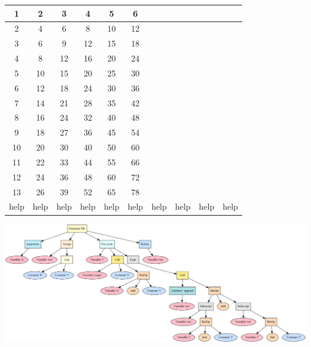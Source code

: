 \documentclass[12pt]{article}
\begin{document}
\begin{tabular}{ |c|c|c|c|c|c|c|c|c|c|}
\hline
1 & 2 & 3 & 4 & 5 & 6 &  &  &  &   \\
\hline
2 & 4 & 6 & 8 & 10 & 12 &  &  &  &   \\
\hline
3 & 6 & 9 & 12 & 15 & 18 &  &  &  &   \\
\hline
4 & 8 & 12 & 16 & 20 & 24 &  &  &  &   \\
\hline
5 & 10 & 15 & 20 & 25 & 30 &  &  &  &   \\
\hline
6 & 12 & 18 & 24 & 30 & 36 &  &  &  &   \\
\hline
7 & 14 & 21 & 28 & 35 & 42 &  &  &  &   \\
\hline
8 & 16 & 24 & 32 & 40 & 48 &  &  &  &   \\
\hline
9 & 18 & 27 & 36 & 45 & 54 &  &  &  &   \\
\hline
10 & 20 & 30 & 40 & 50 & 60 &  &  &  &   \\
\hline
11 & 22 & 33 & 44 & 55 & 66 &  &  &  &   \\
\hline
12 & 24 & 36 & 48 & 60 & 72 &  &  &  &   \\
\hline
13 & 26 & 39 & 52 & 65 & 78 &  &  &  &   \\
\hline
help & help & help & help & help & help & help & help & help & help  \\
\hline
\end{tabular}

\includegraphics[scale=0.25]{AST.png}
\end{document}
